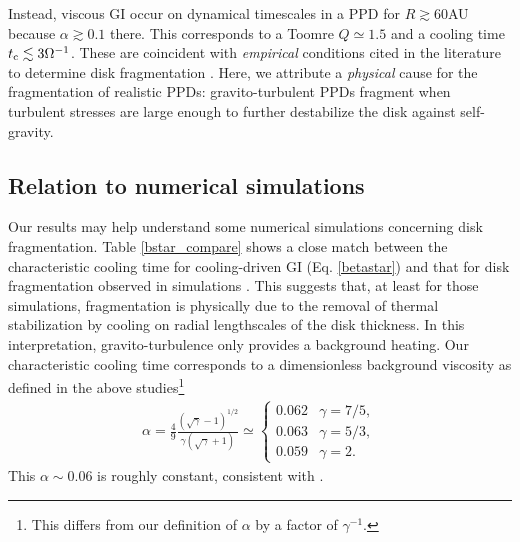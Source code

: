 Instead, viscous GI occur on dynamical timescales in a PPD for
$R\gtrsim 60$AU because $\alpha\gtrsim0.1$ there. 
This corresponds to a Toomre $Q\simeq 1.5$ and 
a cooling time $t_\mathrm{c}\lesssim 3\Omega^{-1}$. These are coincident with 
\emph{empirical} conditions cited in the literature to determine disk
fragmentation 
\citep[e.g.][]{rafikov15}. Here, we attribute a \emph{physical}
cause for the fragmentation of realistic PPDs: gravito-turbulent PPDs
fragment when turbulent stresses are large enough to further
destabilize the disk against self-gravity.    


\subsection{Relation to numerical simulations}\label{prev_works}
Our results may help understand some numerical simulations 
concerning disk fragmentation. Table 
\ref{bstar_compare} shows a close match between the characteristic
cooling time for cooling-driven GI (Eq. \ref{betastar}) 
and that for disk fragmentation observed in simulations 
\citep{gammie01,rice05,rice11}. This suggests that, at least for those
simulations, fragmentation is physically due to the removal of
thermal stabilization by cooling on radial lengthscales of the disk 
thickness. In this interpretation, gravito-turbulence only
provides a background heating. %
Our characteristic cooling time corresponds to a dimensionless background viscosity 
as defined in the above studies\footnote{This differs from our
  definition of $\alpha$ by a factor of $\gamma^{-1}$.}  
\begin{align}
  \alpha =
  \frac{4}{9}\frac{\left(\sqrt{\gamma}-1\right)^{1/2}}{\gamma\left(\sqrt{\gamma}+1\right)}
  \simeq \begin{cases}
    0.062 & \gamma = 7/5, \\
    0.063 & \gamma = 5/3,\\
    0.059 & \gamma = 2.
  \end{cases}
\end{align}
This $\alpha\sim0.06$ is roughly constant, consistent with \cite{rice05}. 


